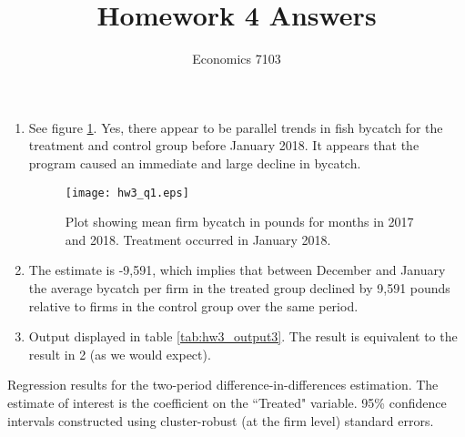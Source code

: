 \documentclass{article}
\title{Homework 4 Answers}
\author{Economics 7103}
\date{ }
\begin{document}
  
\maketitle

\begin{enumerate}
\item See figure \ref{fig:hw3_q1}.  Yes, there appear to be parallel trends in fish bycatch for the treatment and control group before January 2018.  It appears that the program caused an immediate and large decline in bycatch.
\begin{figure}[h]
    \centering
    \texttt{[image: hw3\_q1.eps]}
    \caption{Plot showing mean firm bycatch in pounds for months in 2017 and 2018.  Treatment occurred in January 2018.}
    \label{fig:hw3_q1}
\end{figure}
\item The estimate is -9,591, which implies that between December and January the average bycatch per firm in the treated group declined by 9,591 pounds relative to firms in the control group over the same period.
\item Output displayed in table \ref{tab:hw3_output3}.  The result is equivalent to the result in 2 (as we would expect).
\end{enumerate}

\begin{table}[h]
    \centering
    
    \caption{Regression results for the two-period difference-in-differences estimation.  The estimate of interest is the coefficient on the ``Treated" variable. 95\% confidence intervals constructed using cluster-robust (at the firm level) standard errors.}
    \label{tab:hw3_output3}
\end{table}
\end{document}

